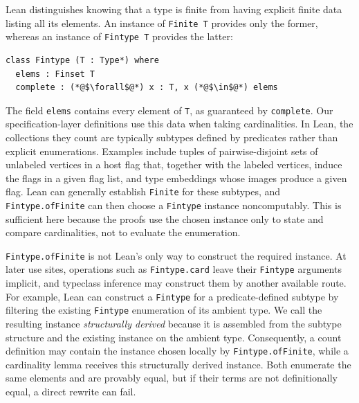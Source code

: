 \documentclass[acmsmall,screen=true,acmthm=false]{acmart}
\DeclareRobustCommand{\lean}[1]{{\def\_{\textunderscore\allowbreak}\texttt{#1}}}
\begin{document}
Lean distinguishes knowing that a type is finite from having explicit finite
data listing all its elements.  An instance of \lean{Finite T} provides only
the former, whereas an instance of \lean{Fintype T} provides the latter:
\begin{lstlisting}
class Fintype (T : Type*) where
  elems : Finset T
  complete : (*@$\forall$@*) x : T, x (*@$\in$@*) elems
\end{lstlisting}
The field \lean{elems} contains every element of \lean{T}, as guaranteed by
\lean{complete}.  Our specification-layer definitions use this data when
taking cardinalities.  In Lean, the collections they count are typically
subtypes defined by predicates rather than explicit enumerations.  Examples
include tuples of pairwise-disjoint sets of unlabeled vertices in a host flag
that, together with the labeled vertices, induce the flags in a given flag
list, and type embeddings whose images produce a given flag.  Lean can
generally establish \lean{Finite} for these subtypes, and
\lean{Fintype.ofFinite} can then choose a \lean{Fintype} instance
noncomputably.  This is sufficient here because the proofs use the chosen
instance only to state and compare cardinalities, not to evaluate the
enumeration.

\lean{Fintype.ofFinite} is not Lean's only way to construct the required
instance.  At later use sites, operations such as \lean{Fintype.card} leave
their \lean{Fintype} arguments implicit, and typeclass inference may construct
them by another available route.  For example, Lean can construct a
\lean{Fintype} for a predicate-defined subtype by filtering the existing
\lean{Fintype} enumeration of its ambient type.  We call the resulting instance
\emph{structurally derived} because it is assembled from the subtype structure
and the existing instance on the ambient type.  Consequently, a count
definition may contain the instance chosen locally by
\lean{Fintype.ofFinite}, while a cardinality lemma receives this structurally
derived instance.  Both enumerate the same elements and are provably equal,
but if their terms are not definitionally equal, a direct rewrite can fail.
\end{document}

